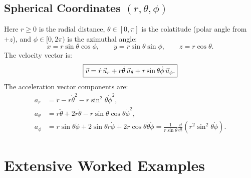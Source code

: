 \subsection{Spherical Coordinates $(r, \theta, \phi)$}
Here $r \ge 0$ is the radial distance, $\theta \in [0, \pi]$ is the colatitude (polar angle from $+z$), and $\phi \in [0, 2\pi)$ is the azimuthal angle:
\[
x = r\sin\theta\cos\phi, \qquad y = r\sin\theta\sin\phi, \qquad z = r\cos\theta.
\]
The velocity vector is:
\[
\boxed{\vec{v} = \dot{r}\,\vec{u}_r + r\dot{\theta}\,\vec{u}_\theta + r\sin\theta\dot{\phi}\,\vec{u}_\phi.}
\]
The acceleration vector components are:
\begin{align}
a_r &= \ddot{r} - r\dot{\theta}^2 - r\sin^2\theta\dot{\phi}^2, \\
a_\theta &= r\ddot{\theta} + 2\dot{r}\dot{\theta} - r\sin\theta\cos\theta\dot{\phi}^2, \\
a_\phi &= r\sin\theta\ddot{\phi} + 2\sin\theta\dot{r}\dot{\phi} + 2r\cos\theta\dot{\theta}\dot{\phi} = \frac{1}{r\sin\theta}\frac{\dd}{\dd t}\left(r^2\sin^2\theta\dot{\phi}\right).
\end{align}

\section{Extensive Worked Examples}

